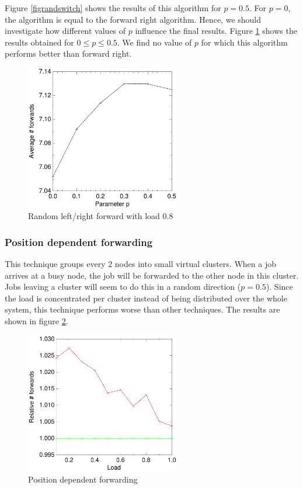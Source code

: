 \documentclass[10pt,a4paper]{article}
\begin{document}
Figure \ref{figrandswitch} shows the results of this algorithm for $p=0.5$. For $p=0$, the algorithm is equal to the forward right algorithm. Hence, we should investigate how different values of $p$ influence the final results. Figure \ref{figrandswitchp} shows the results obtained for $0 \leq p \leq 0.5$. We find no value of $p$ for which this algorithm performs better than forward right.

\begin{figure}[h!tb]
\centering
\includegraphics[width=0.6\textwidth]{data/randswitchp.pdf}
\caption{Random left/right forward with load $0.8$}
\label{figrandswitchp}
\end{figure}

\subsubsection*{Position dependent forwarding}
This technique groups every 2 nodes into small virtual clusters. When a job arrives at a busy node, the job will be forwarded to the other node in this cluster. Jobs leaving a cluster will seem to do this in a random direction ($p=0.5$). Since the load is concentrated per cluster instead of being distributed over the whole system, this technique performs worse than other techniques. The results are shown in figure \ref{figevenswitch}.

\begin{figure}[h!tb]
\centering
\includegraphics[width=0.6\textwidth]{data/evenswitchright.pdf}
\caption{Position dependent forwarding}
\label{figevenswitch}
\end{figure}
\end{document}

